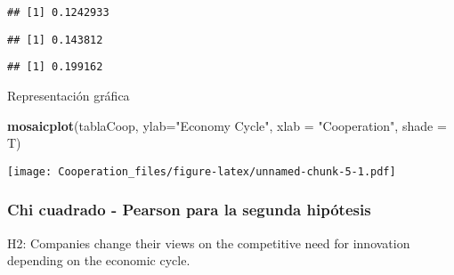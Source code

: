 \documentclass[
]{article}
\newenvironment{Shaded}{\begin{snugshade}}{\end{snugshade}}
\newcommand{\DataTypeTok}[1]{\textcolor[rgb]{0.13,0.29,0.53}{#1}}
\newcommand{\DecValTok}[1]{\textcolor[rgb]{0.00,0.00,0.81}{#1}}
\newcommand{\KeywordTok}[1]{\textcolor[rgb]{0.13,0.29,0.53}{\textbf{#1}}}
\newcommand{\NormalTok}[1]{#1}
\newcommand{\OperatorTok}[1]{\textcolor[rgb]{0.81,0.36,0.00}{\textbf{#1}}}
\newcommand{\OtherTok}[1]{\textcolor[rgb]{0.56,0.35,0.01}{#1}}
\newcommand{\StringTok}[1]{\textcolor[rgb]{0.31,0.60,0.02}{#1}}
\begin{document}
\begin{verbatim}
## [1] 0.1242933
\end{verbatim}

\begin{Shaded}
\end{Shaded}

\begin{verbatim}
## [1] 0.143812
\end{verbatim}

\begin{Shaded}
\end{Shaded}

\begin{verbatim}
## [1] 0.199162
\end{verbatim}

Representación gráfica

\begin{Shaded}
\begin{Highlighting}[]
\KeywordTok{mosaicplot}\NormalTok{(tablaCoop, }\DataTypeTok{ylab=}\StringTok{"Economy Cycle"}\NormalTok{, }\DataTypeTok{xlab =} \StringTok{"Cooperation"}\NormalTok{,}
           \DataTypeTok{shade =}\NormalTok{ T)}
\end{Highlighting}
\end{Shaded}

\texttt{[image: Cooperation\_files/figure-latex/unnamed-chunk-5-1.pdf]}

\hypertarget{chi-cuadrado---pearson-para-la-segunda-hipuxf3tesis}{%
\subsubsection{Chi cuadrado - Pearson para la segunda
hipótesis}\label{chi-cuadrado---pearson-para-la-segunda-hipuxf3tesis}}

H2: Companies change their views on the competitive need for innovation
depending on the economic cycle.

\begin{Shaded}
\end{Shaded}
\end{document}
